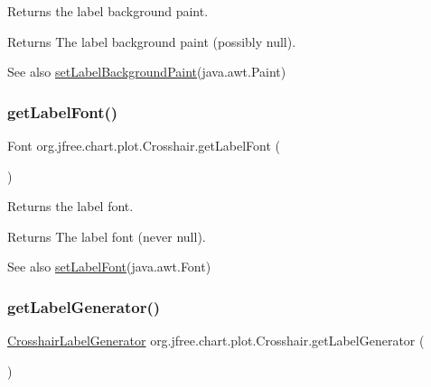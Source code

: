 Returns the label background paint.

\begin{DoxyReturn}{Returns}
The label background paint (possibly {\ttfamily null}).
\end{DoxyReturn}
\begin{DoxySeeAlso}{See also}
\mbox{\hyperlink{classorg_1_1jfree_1_1chart_1_1plot_1_1_crosshair_ac9af1982e63da81f4b921beb1dd4fbc0}{set\+Label\+Background\+Paint}}(java.\+awt.\+Paint) 
\end{DoxySeeAlso}
\mbox{\label{classorg_1_1jfree_1_1chart_1_1plot_1_1_crosshair_afb84271c0859b4aed129081296f9ea32}} 
\subsubsection{\texorpdfstring{get\+Label\+Font()}{getLabelFont()}}
{\footnotesize\ttfamily Font org.\+jfree.\+chart.\+plot.\+Crosshair.\+get\+Label\+Font (\begin{DoxyParamCaption}{ }\end{DoxyParamCaption})}

Returns the label font.

\begin{DoxyReturn}{Returns}
The label font (never {\ttfamily null}).
\end{DoxyReturn}
\begin{DoxySeeAlso}{See also}
\mbox{\hyperlink{classorg_1_1jfree_1_1chart_1_1plot_1_1_crosshair_af031c43475ea37a6083b21c732ab90f7}{set\+Label\+Font}}(java.\+awt.\+Font) 
\end{DoxySeeAlso}
\mbox{\label{classorg_1_1jfree_1_1chart_1_1plot_1_1_crosshair_ad20e769eeae9e0ba7f04c152b080a04f}} 
\subsubsection{\texorpdfstring{get\+Label\+Generator()}{getLabelGenerator()}}
{\footnotesize\ttfamily \mbox{\hyperlink{interfaceorg_1_1jfree_1_1chart_1_1labels_1_1_crosshair_label_generator}{Crosshair\+Label\+Generator}} org.\+jfree.\+chart.\+plot.\+Crosshair.\+get\+Label\+Generator (\begin{DoxyParamCaption}{ }\end{DoxyParamCaption})}

